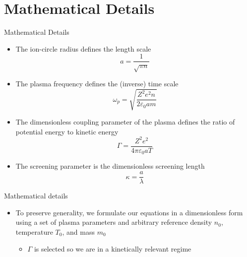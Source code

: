 \documentclass{beamer}
\begin{document}
	\section{Mathematical Details}
	
	
	\begin{frame}{Mathematical Details}
		\begin{itemize}
			\item  The ion-circle radius defines the length scale
			\begin{equation*}
			a = \frac{1}{\sqrt{\pi n}}
			\end{equation*}
			\item  The plasma frequency defines the (inverse) time scale
			\begin{equation*}
			\omega_p = \sqrt{\frac{Z^2e^2n}{2\varepsilon_0am}}
			\end{equation*}
			\item  The dimensionless coupling parameter of the plasma defines the ratio of potential energy to kinetic energy
			\begin{equation*}
			\Gamma = \frac{Z^2e^2}{4\pi\varepsilon_0aT}
			\end{equation*}
			\item  The screening parameter is the dimensionless screening length
			\begin{equation*}
			\kappa = \frac{a}{\lambda}
			\end{equation*}
		\end{itemize}
	\end{frame}
	
	\begin{frame}{Mathematical details}
		\begin{itemize}
			\item  To preserve generality, we formulate our equations in a dimensionless form using a set of plasma parameters and arbitrary reference density $n_0$, temperature $T_0$, and mass $m_0$
			\vspace{1em}
			\begin{itemize}
			\item $\Gamma$ is selected so we are in a kinetically relevant regime
			\end{itemize}
		\end{itemize}
	\end{frame}
	
\end{document}
